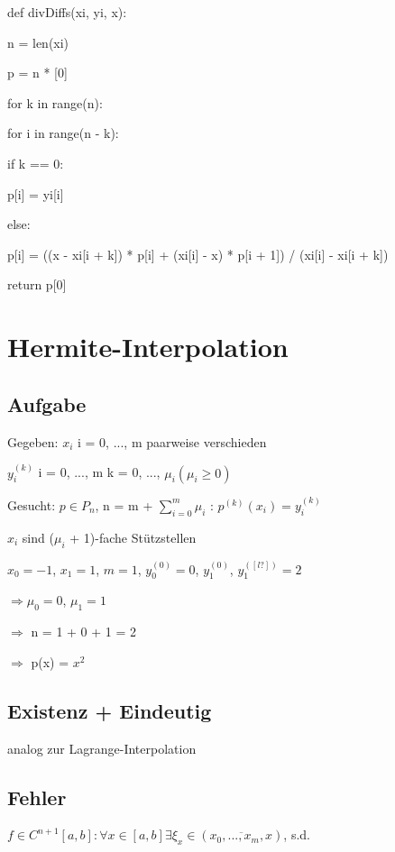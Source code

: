 \documentclass[12pt,a4paper]{article} %
\newcommand*\tab[1][1cm]{\hspace*{#1}}
\begin{document}
	def divDiffs(xi, yi, x):
	
	n = len(xi)
	
	p = n * [0]
	
	for k in range(n):
	
	\tab for i in range(n - k):
	
	\tab \tab if k == 0:

	\tab \tab \tab p[i] = yi[i]
	
	\tab \tab else:
	
	\tab \tab \tab p[i] = ((x - xi[i + k]) * p[i] + (xi[i] - x) * p[i + 1]) / (xi[i] - xi[i + k])
	
	return p[0]	
	
	\newpage
	
	\section{Hermite-Interpolation}
	
	\subsection{Aufgabe}
	
	Gegeben: $x_i$ \tab \space i = 0, ..., m \tab paarweise verschieden
	
	\tab \space $y_i^{(k)}$ \tab i = 0, ..., m \tab k = 0, ..., $\mu_i (\mu_i \ge 0)$
	
	Gesucht: $p \in P_n$, n = m + $\sum_{i = 0}^{m}\mu_i$ : $p^{(k)}(x_i) = y_i^{(k)}$
	
	$x_i$ sind ($\mu_i$ + 1)-fache Stützstellen
	
	$x_0 = -1$, $x_1 = 1$, $m = 1$, $y_0^{(0)} = 0$, $y_1^{(0)}$, $y_1^{([l?])} = 2$
	
	$\Rightarrow \mu_0 = 0$, $\mu_1 = 1$
	
	$\Rightarrow$ n = 1 + 0 + 1 = 2
	
	$\Rightarrow$ p(x) = $x^2$
	
	\subsection{Existenz + Eindeutig}
	
	analog zur Lagrange-Interpolation
	
	\subsection{Fehler}
	
	$f \in C^{n + 1}[a, b]: \forall x \in [a, b] \exists \xi_x \in (\overline{x_0, ..., x_m, x})$, s.d.
	
\end{document}

